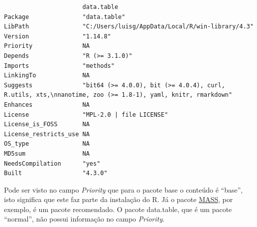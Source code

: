 \documentclass[
  letterpaper,
  DIV=11,
  numbers=noendperiod]{scrreprt}
\begin{document}
\begin{verbatim}
                      data.table                                                                                               
Package               "data.table"                                                                                             
LibPath               "C:/Users/luisg/AppData/Local/R/win-library/4.3"                                                         
Version               "1.14.8"                                                                                                 
Priority              NA                                                                                                       
Depends               "R (>= 3.1.0)"                                                                                           
Imports               "methods"                                                                                                
LinkingTo             NA                                                                                                       
Suggests              "bit64 (>= 4.0.0), bit (>= 4.0.4), curl, R.utils, xts,\nnanotime, zoo (>= 1.8-1), yaml, knitr, rmarkdown"
Enhances              NA                                                                                                       
License               "MPL-2.0 | file LICENSE"                                                                                 
License_is_FOSS       NA                                                                                                       
License_restricts_use NA                                                                                                       
OS_type               NA                                                                                                       
MD5sum                NA                                                                                                       
NeedsCompilation      "yes"                                                                                                    
Built                 "4.3.0"                                                                                                  
\end{verbatim}

Pode ser visto no campo \emph{Priority} que para o pacote base o
conteúdo é ``base'', isto significa que este faz parte da instalação do
R. Já o pacote
\href{https://cran.r-project.org/web/packages/MASS/index.html}{MASS},
por exemplo, é um pacote recomendado. O pacote data.table, que é um
pacote ``normal'', não possui informação no campo \emph{Priority}.
\end{document}
